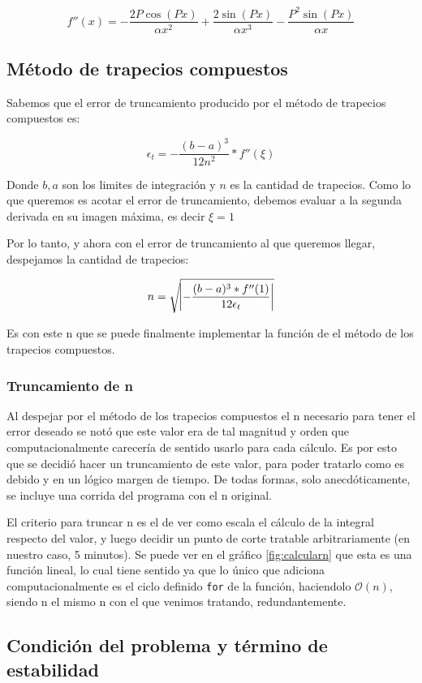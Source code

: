 \documentclass[11pt,a4paper]{article}
\begin{document}
\[ f''(x) = - \frac{2 P \cos{(P x)}}{\alpha x^2} + \frac{2 \sin{(P x)}}{\alpha x^3} - \frac{P^2 \sin{(P x)}}{\alpha x}\]

\subsection{Método de trapecios compuestos}

Sabemos que el error de truncamiento producido por el método de trapecios compuestos es:

\[ \epsilon_t = - \frac{{(b - a)}^3}{12 n^2} * f''(\xi) \]

Donde \(b, a\) son los limites de integración y \(n\) es la cantidad de trapecios. Como lo que queremos es acotar el error de truncamiento, debemos evaluar a la segunda derivada en su imagen máxima, es decir \(\xi = 1 \)

Por lo tanto, y ahora con el error de truncamiento al que queremos llegar, despejamos la cantidad de trapecios:

\[ n = \sqrt{ \abs{ - \frac{(b - a)^3 * f''(1)}{12 \epsilon_t}}} \]

Es con este n que se puede finalmente implementar la función de el método de los trapecios compuestos.

\subsubsection{Truncamiento de n}

Al despejar por el método de los trapecios compuestos el n necesario para tener el error deseado se notó que este valor era de tal magnitud y orden que computacionalmente carecería de sentido usarlo para cada cálculo. Es por esto que se decidió hacer un truncamiento de este valor, para poder tratarlo como es debido y en un lógico margen de tiempo. De todas formas, solo anecdóticamente, se incluye una corrida del programa con el n original.

El criterio para truncar n es el de ver como escala el cálculo de la integral respecto del valor, y luego decidir un punto de corte tratable arbitrariamente (en nuestro caso, 5 minutos). Se puede ver en el gráfico \ref{fig:calcularn} que esta es una función lineal, lo cual tiene sentido ya que lo único que adiciona computacionalmente es el ciclo definido \texttt{for} de la función, haciendolo \(\mathcal{O}(n)\), siendo n el mismo n con el que venimos tratando, redundantemente.

\subsection{Condición del problema y término de estabilidad}
\end{document}
